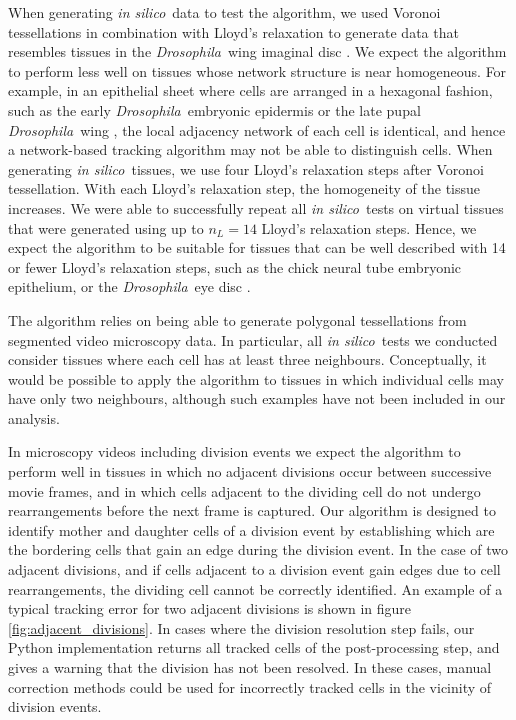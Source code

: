 \documentclass[a4paper,11pt]{article}
\newcommand{\Drosophila}{\textit{Drosophila}~}
\newcommand{\insilico}{\textit{in silico}~}
\begin{document}
When generating \insilico data to test the algorithm, we used Voronoi tessellations in combination with Lloyd's relaxation to generate data that resembles tissues in the \Drosophila wing imaginal disc \cite{Sanchez-Gutierrez2015}.
We expect the algorithm to perform less well on tissues whose network structure is near homogeneous.
For example, in an epithelial sheet where cells are arranged in a hexagonal fashion, such as the early \Drosophila embryonic epidermis \cite{Warn1983} or the late pupal \Drosophila wing \cite{Classen2005}, the local adjacency network of each cell is identical, and hence a network-based tracking algorithm may not be able to distinguish cells.
When generating \insilico tissues, we use four Lloyd's relaxation steps after Voronoi tessellation.
With each Lloyd's relaxation step, the homogeneity of the tissue increases.
We were able to successfully repeat all \insilico tests on virtual tissues that were generated using up to $n_L=14$ Lloyd's relaxation steps.
Hence, we expect the algorithm to be suitable for tissues that can be well described with 14 or fewer Lloyd's relaxation steps, such as the chick neural tube embryonic epithelium, or the \Drosophila eye disc \cite{Sanchez-Gutierrez2015}.

The algorithm relies on being able to generate polygonal tessellations from segmented video microscopy data. 
In particular, all \insilico tests we conducted consider tissues where each cell has at least three neighbours. Conceptually, it would be possible to apply the algorithm to tissues in which individual cells may have only two neighbours, although such examples have not been included in our analysis.

In microscopy videos including division events we expect the algorithm to perform well in tissues in which no adjacent divisions occur between successive movie frames, and in which cells adjacent to the dividing cell do not undergo rearrangements before the next frame is captured. 
Our algorithm is designed to identify mother and daughter cells of a division event by establishing which are the bordering cells that gain an edge during the division event. 
In the case of two adjacent divisions, and if cells adjacent to a division event gain edges due to cell rearrangements, the dividing cell cannot be correctly identified.
An example of a typical tracking error for two adjacent divisions is shown in figure \ref{fig:adjacent_divisions}. 
In cases where the division resolution step fails, our Python implementation returns all tracked cells of the post-processing step, and gives a warning that the division has not been resolved. 
In these cases, manual correction methods could be used for incorrectly tracked cells in the vicinity of division events.
\end{document}
